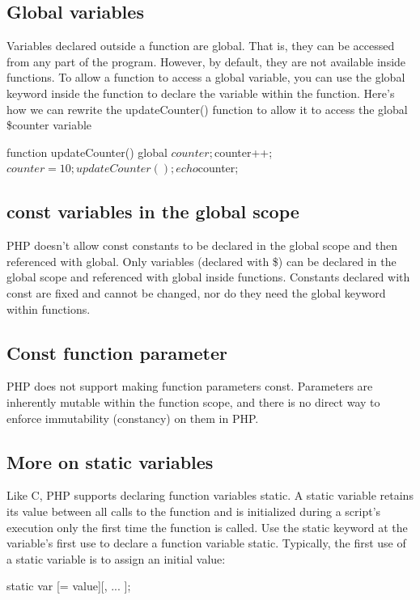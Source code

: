 \documentclass{report}
\begin{document}
\subsection{Global variables}
\bigbreak \noindent
Variables declared outside a function are global. That is, they can be accessed from any
part of the program. However, by default, they are not available inside functions. To
allow a function to access a global variable, you can use the global keyword inside the
function to declare the variable within the function. Here’s how we can rewrite the
updateCounter() function to allow it to access the global \$counter variable
\bigbreak \noindent 
\begin{phpcode}
    function updateCounter()
    {
        global $counter;
        $counter++;
    }
    $counter = 10;
    updateCounter();
    echo $counter;
\end{phpcode}
\bigbreak \noindent 

\subsection{const variables in the global scope}
\bigbreak \noindent 
PHP doesn't allow const constants to be declared in the global scope and then referenced with global. Only variables (declared with \$) can be declared in the global scope and referenced with global inside functions. Constants declared with const are fixed and cannot be changed, nor do they need the global keyword within functions.

\bigbreak \noindent 
\subsection{Const function parameter}
\bigbreak \noindent 
PHP does not support making function parameters const. Parameters are inherently mutable within the function scope, and there is no direct way to enforce immutability (constancy) on them in PHP.


\bigbreak \noindent 
\subsection{More on static variables}
\bigbreak \noindent 
Like C, PHP supports declaring function variables static. A static variable retains its
value between all calls to the function and is initialized during a script’s execution only
the first time the function is called. Use the static keyword at the variable’s first use
to declare a function variable static. Typically, the first use of a static variable is to assign
an initial value:
\bigbreak \noindent 
\begin{phpcode}
static var [= value][, ... ];
\end{phpcode}
\end{document}
